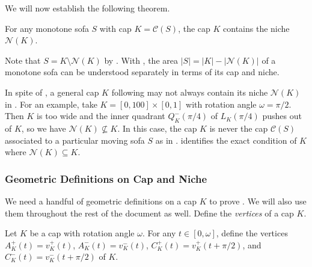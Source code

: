 We will now establish the following theorem.

\begin{theorem}

For any monotone sofa \(S\) with cap \(K = \mathcal{C}(S)\), the cap \(K\) contains the niche \(\mathcal{N}(K)\).

\label{thm:niche-in-cap}
\end{theorem}

Note that \(S = K \setminus \mathcal{N}(K)\) by . With , the area \(|S| = |K| - |\mathcal{N}(K)|\) of a monotone sofa can be understood separately in terms of its cap and niche.

\begin{remark}

In spite of , a general cap \(K\) following  may not always contain its niche \(\mathcal{N}(K)\) in . For an example, take \(K = [0, 100] \times [0, 1]\) with rotation angle \(\omega = \pi/2\). Then \(K\) is too wide and the inner quadrant \(Q_K^-(\pi/4)\) of \(L_K(\pi/4)\) pushes out of \(K\), so we have \(\mathcal{N}(K) \not\subseteq K\). In this case, the cap \(K\) is never the cap \(\mathcal{C}(S)\) associated to a particular moving sofa \(S\) as in .  identifies the exact condition of \(K\) where \(\mathcal{N}(K) \subseteq K\).

\label{rem:niche-not-in-cap}
\end{remark}

\subsubsection{Geometric Definitions on Cap and Niche}

We need a handful of geometric definitions on a cap \(K\) to prove . We will also use them throughout the rest of the document as well. Define the \emph{vertices} of a cap \(K\).

\begin{definition}

Let \(K\) be a cap with rotation angle \(\omega\). For any \(t \in [0, \omega]\), define the vertices \(A^+_K(t) = v^+_K(t)\), \(A^-_K(t) = v^-_K(t)\), \(C^+_K(t) = v^+_K(t + \pi/2)\), and \(C^-_K(t) = v^-_K(t + \pi/2)\) of \(K\).

\label{def:cap-vertices}
\end{definition}

